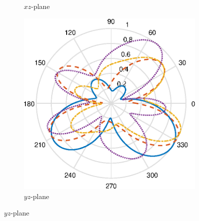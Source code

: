 \begin{figure}[H]
\begin{subfigure}[b]{0.26\textwidth}
        \caption{$xz$-plane}
        \label{fig:ff_xz_cell}
    \end{subfigure}
    \begin{subfigure}[b]{0.26\textwidth}
        \includegraphics[width=\textwidth]{img/ff_cell_yz.eps}
        \caption{$yz$-plane}
        \label{fig:ff_yz_cell}
    \end{subfigure}
    

\end{figure}
